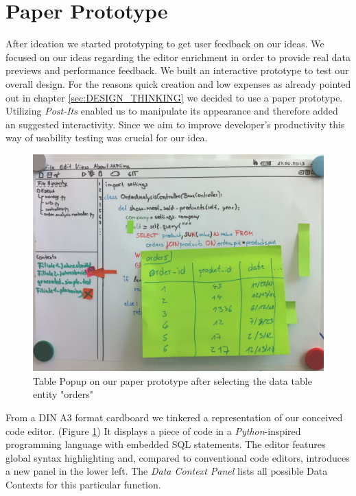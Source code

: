 
\section[Paper Prototype (Author: Thomas B\"unger]{Paper Prototype}
\label{sec:PAPER_PROTOTYPE}

After ideation we started prototyping to get user feedback on our ideas. 
We focused on our ideas regarding the editor enrichment in order to provide real data previews and performance feedback.
We built an interactive prototype to test our overall design. For the reasons quick creation and low expenses as already pointed out in chapter \ref{sec:DESIGN_THINKING} we decided to use a paper prototype. Utilizing \emph{Post-Its} enabled us to manipulate its appearance and therefore added an suggested interactivity.
Since we aim to improve developer's productivity this way of usability testing was crucial for our idea. \\


\begin{figure}
\begin{centering}
    \includegraphics[width=1.0\linewidth]{images/paper_prototype2}
    \caption{Table Popup on our paper prototype after selecting the data table entity "orders"}
    \label{fig:paper_prototype2}
\end{centering}
\end{figure}

From a DIN A3 format cardboard we tinkered a representation of our conceived code editor. (Figure \ref{fig:paper_prototype2})
It displays a piece of code in a \emph{Python}-inspired programming language with embedded SQL statements.
The editor features global syntax highlighting and, compared to conventional code editors, introduces a new panel in the lower left. The \emph{Data Context Panel} lists all possible Data Contexts for this particular function.\\

